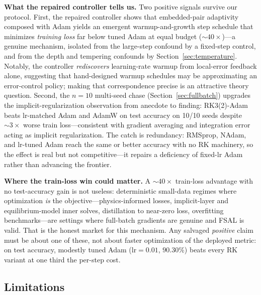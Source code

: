 \documentclass{article}
\begin{document}
\textbf{What the repaired controller tells us.} Two positive signals survive our protocol. First, the repaired controller shows that embedded-pair adaptivity composed with Adam yields an emergent warmup-and-growth step schedule that minimizes \emph{training loss} far below tuned Adam at equal budget (${\sim}40\times$)---a genuine mechanism, isolated from the large-step confound by a fixed-step control, and from the depth and tempering confounds by Section~\ref{sec:temperature}. Notably, the controller \emph{rediscovers} learning-rate warmup from local-error feedback alone, suggesting that hand-designed warmup schedules may be approximating an error-control policy; making that correspondence precise is an attractive theory question. Second, the $n{=}10$ multi-seed chase (Section~\ref{sec:fullbatch}) upgrades the implicit-regularization observation from anecdote to finding: RK3(2)-Adam beats lr-matched Adam and AdamW on test accuracy on 10/10 seeds despite ${\sim}3\times$ worse train loss---consistent with gradient averaging and integration error acting as implicit regularization. The catch is redundancy: RMSprop, NAdam, and lr-tuned Adam reach the same or better accuracy with no RK machinery, so the effect is real but not competitive---it repairs a deficiency of fixed-lr Adam rather than advancing the frontier.

\textbf{Where the train-loss win could matter.} A ${\sim}40\times$ train-loss advantage with no test-accuracy gain is not useless: deterministic small-data regimes where optimization \emph{is} the objective---physics-informed losses, implicit-layer and equilibrium-model inner solves, distillation to near-zero loss, overfitting benchmarks---are settings where full-batch gradients are genuine and FSAL is valid. That is the honest market for this mechanism. Any salvaged \emph{positive} claim must be about one of these, not about faster optimization of the deployed metric: on test accuracy, modestly tuned Adam ($\mathrm{lr}{=}0.01$, $90.30\%$) beats every RK variant at one third the per-step cost.

\subsection{Limitations}
\label{sec:limitations}
\end{document}
